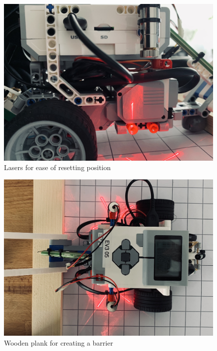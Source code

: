 \begin{itemize}
\begin{itemize}
                \begin{figure}[!ht] 
                        \centering \includegraphics[scale=5.0]{"images/experiment_2/experiment-8.png"}
                        \caption{Lasers for ease of resetting position}
                        \label{fig:lasers2}
                \end{figure}
                
                \begin{figure}[!ht] 
                        \centering \includegraphics[scale=5.0]{"images/experiment_2/experiment-6.png"}
                        \caption{Wooden plank for creating a barrier}
                        \label{fig:wooden plank}
                \end{figure}
                

\end{itemize}
\end{itemize}
